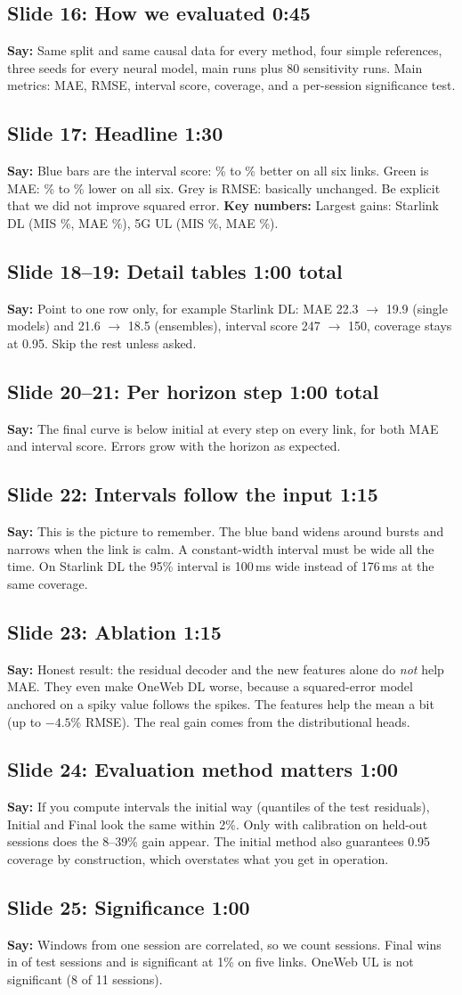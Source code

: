 \documentclass[11pt]{article}
\newcommand{\slide}[3]{\subsection*{Slide #1: #2 \hfill{\normalsize\color{gray}#3}}}
\newcommand{\say}{\textbf{Say:} }
\newcommand{\key}{\textbf{Key numbers:} }
\begin{document}
\slide{16}{How we evaluated}{0:45}
\say Same split and same causal data for every method, four simple references, three seeds for every neural model, \NRuns{} main runs plus 80 sensitivity runs. Main metrics: MAE, RMSE, interval score, coverage, and a per-session significance test.

\slide{17}{Headline}{1:30}
\say Blue bars are the interval score: \ChgMISWorst\% to \ChgMISBest\% better on all six links. Green is MAE: \ChgMAEWorst\% to \ChgMAEBest\% lower on all six. Grey is RMSE: basically unchanged. Be explicit that we did not improve squared error.
\key Largest gains: Starlink DL (MIS \ChgMISSLDL\%, MAE \ChgMAESLDL\%), 5G UL (MIS \ChgMISQUL\%, MAE \ChgMAEQUL\%).

\slide{18--19}{Detail tables}{1:00 total}
\say Point to one row only, for example Starlink DL: MAE 22.3 $\rightarrow$ 19.9 (single models) and 21.6 $\rightarrow$ 18.5 (ensembles), interval score 247 $\rightarrow$ 150, coverage stays at 0.95. Skip the rest unless asked.

\slide{20--21}{Per horizon step}{1:00 total}
\say The final curve is below initial at every step on every link, for both MAE and interval score. Errors grow with the horizon as expected.

\slide{22}{Intervals follow the input}{1:15}
\say This is the picture to remember. The blue band widens around bursts and narrows when the link is calm. A constant-width interval must be wide all the time. On Starlink DL the 95\% interval is 100\,ms wide instead of 176\,ms at the same coverage.

\slide{23}{Ablation}{1:15}
\say Honest result: the residual decoder and the new features alone do \emph{not} help MAE. They even make OneWeb DL worse, because a squared-error model anchored on a spiky value follows the spikes. The features help the mean a bit (up to $-4.5\%$ RMSE). The real gain comes from the distributional heads.

\slide{24}{Evaluation method matters}{1:00}
\say If you compute intervals the initial way (quantiles of the test residuals), Initial and Final look the same within 2\%. Only with calibration on held-out sessions does the 8--39\% gain appear. The initial method also guarantees 0.95 coverage by construction, which overstates what you get in operation.

\slide{25}{Significance}{1:00}
\say Windows from one session are correlated, so we count sessions. Final wins in \SessWinsTotal{} of \SessNTotal{} test sessions and is significant at 1\% on five links. OneWeb UL is not significant (8 of 11 sessions).
\end{document}
